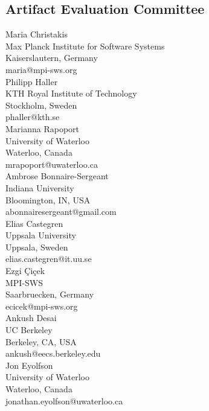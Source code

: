 \documentclass[a4paper,UKenglish]{dartsmaster}
\begin{document}
\begin{participants}

\chapter[Committee]{Artifact Evaluation Committee}
\participant Maria Christakis \\
Max Planck Institute for Software Systems \\
Kaiserslautern, Germany\\ 
maria@mpi-sws.org\\

\participant Philipp Haller\\
KTH Royal Institute of Technology\\
Stockholm, Sweden\\ 
phaller@kth.se\\

\participant Marianna Rapoport\\
University of Waterloo\\
Waterloo, Canada\\
mrapoport@uwaterloo.ca\\

\participant	Ambrose Bonnaire-Sergeant	\\	Indiana University	\\	Bloomington, IN, USA	\\	abonnairesergeant@gmail.com	\\

\participant	Elias Castegren	\\	Uppsala University	\\	Uppsala, Sweden	\\	elias.castegren@it.uu.se	\\

\participant	Ezgi Çiçek	\\	MPI-SWS	\\	Saarbruecken, Germany	\\	ecicek@mpi-sws.org	\\

\participant	Ankush Desai	\\	UC Berkeley	\\	Berkeley, CA, USA	\\	ankush@eecs.berkeley.edu	\\

\participant	Jon Eyolfson	\\	University of Waterloo	\\	Waterloo, Canada	\\	jonathan.eyolfson@uwaterloo.ca	\\


\end{participants}
\end{document}
